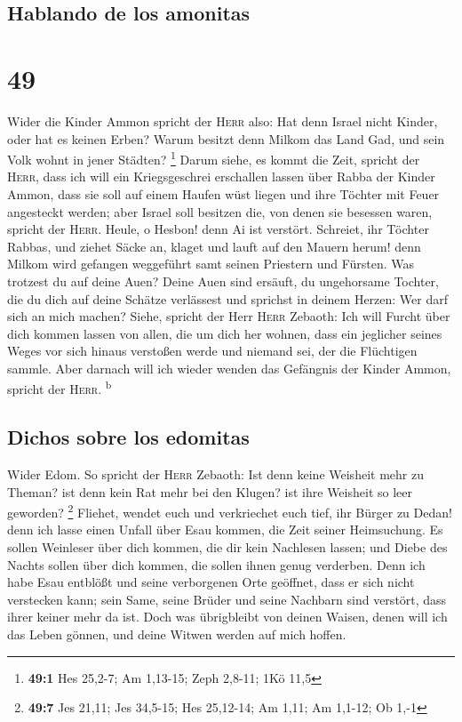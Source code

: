 \hypertarget{hablando-de-los-amonitas}{%
\subsection{Hablando de los amonitas}\label{hablando-de-los-amonitas}}

\hypertarget{section-48}{%
\section{49}\label{section-48}}

 Wider die Kinder Ammon spricht der \textsc{Herr} also:
Hat denn Israel nicht Kinder, oder hat es keinen Erben? Warum besitzt
denn Milkom das Land Gad, und sein Volk wohnt in jener Städten?
\footnote{\textbf{49:1} Hes 25,2-7; Am 1,13-15; Zeph 2,8-11; 1Kö 11,5}
 Darum siehe, es kommt die Zeit, spricht der
\textsc{Herr}, dass ich will ein Kriegsgeschrei erschallen lassen über
Rabba der Kinder Ammon, dass sie soll auf einem Haufen wüst liegen und
ihre Töchter mit Feuer angesteckt werden; aber Israel soll besitzen die,
von denen sie besessen waren, spricht der \textsc{Herr}. 
Heule, o Hesbon! denn Ai ist verstört. Schreiet, ihr Töchter Rabbas, und
ziehet Säcke an, klaget und lauft auf den Mauern herum! denn Milkom wird
gefangen weggeführt samt seinen Priestern und Fürsten. 
Was trotzest du auf deine Auen? Deine Auen sind ersäuft, du ungehorsame
Tochter, die du dich auf deine Schätze verlässest und sprichst in deinem
Herzen: Wer darf sich an mich machen?  Siehe, spricht der
Herr \textsc{Herr} Zebaoth: Ich will Furcht über dich kommen lassen von
allen, die um dich her wohnen, dass ein jeglicher seines Weges vor sich
hinaus verstoßen werde und niemand sei, der die Flüchtigen sammle.
 Aber darnach will ich wieder wenden das Gefängnis der
Kinder Ammon, spricht der \textsc{Herr}. \textsuperscript{b}

\hypertarget{dichos-sobre-los-edomitas}{%
\subsection{Dichos sobre los edomitas}\label{dichos-sobre-los-edomitas}}

 Wider Edom. So spricht der \textsc{Herr} Zebaoth: Ist
denn keine Weisheit mehr zu Theman? ist denn kein Rat mehr bei den
Klugen? ist ihre Weisheit so leer geworden? \footnote{\textbf{49:7} Jes
  21,11; Jes 34,5-15; Hes 25,12-14; Am 1,11; Am 1,1-12; Ob 1,-1}
 Fliehet, wendet euch und verkriechet euch tief, ihr
Bürger zu Dedan! denn ich lasse einen Unfall über Esau kommen, die Zeit
seiner Heimsuchung.  Es sollen Weinleser über dich kommen,
die dir kein Nachlesen lassen; und Diebe des Nachts sollen über dich
kommen, die sollen ihnen genug verderben.  Denn ich habe
Esau entblößt und seine verborgenen Orte geöffnet, dass er sich nicht
verstecken kann; sein Same, seine Brüder und seine Nachbarn sind
verstört, dass ihrer keiner mehr da ist.  Doch was
übrigbleibt von deinen Waisen, denen will ich das Leben gönnen, und
deine Witwen werden auf mich hoffen.

